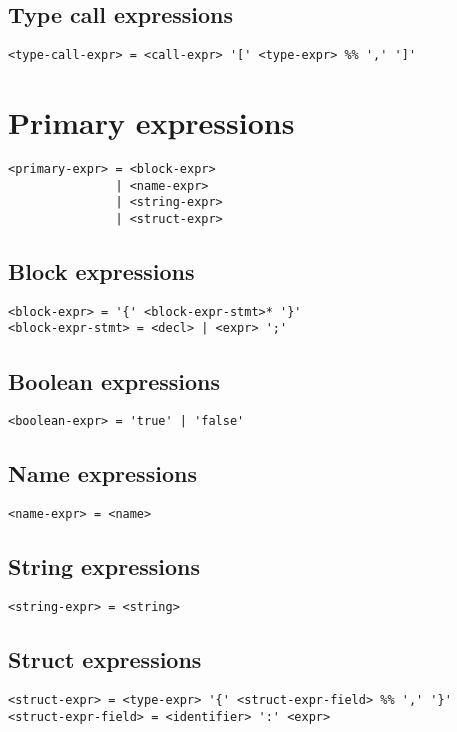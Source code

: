 \documentclass[12pt, oneside]{memoir}
\begin{document}
\subsection{Type call expressions}

\begin{verbatim}
<type-call-expr> = <call-expr> '[' <type-expr> %% ',' ']'
\end{verbatim}

\section{Primary expressions}

\begin{verbatim}
<primary-expr> = <block-expr>
               | <name-expr>
               | <string-expr>
               | <struct-expr>
\end{verbatim}

\subsection{Block expressions}

\begin{verbatim}
<block-expr> = '{' <block-expr-stmt>* '}'
<block-expr-stmt> = <decl> | <expr> ';'
\end{verbatim}

\subsection{Boolean expressions}

\begin{verbatim}
<boolean-expr> = 'true' | 'false'
\end{verbatim}

\subsection{Name expressions}

\begin{verbatim}
<name-expr> = <name>
\end{verbatim}

\subsection{String expressions}

\begin{verbatim}
<string-expr> = <string>
\end{verbatim}

\subsection{Struct expressions}

\begin{verbatim}
<struct-expr> = <type-expr> '{' <struct-expr-field> %% ',' '}'
<struct-expr-field> = <identifier> ':' <expr>
\end{verbatim}
\end{document}

